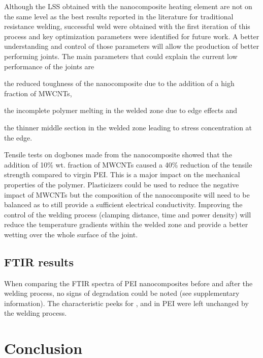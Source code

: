 \documentclass[11pt,review,times]{elsarticle}
\begin{document}
Although the LSS obtained with the nanocomposite heating element are not on the same level as the best results reported in the literature for traditional resistance welding, successful weld were obtained with the first iteration of this process and key optimization parameters were identified for future work. 
A better understanding and control of those parameters will allow the production of better performing joints. 
The main parameters that could explain the current low performance of the joints are \begin{enumerate*}[label=(\arabic*)]
	\item the reduced toughness of the nanocomposite due to the addition of a high fraction of MWCNTs,
	\item the incomplete polymer melting in the welded zone due to edge effects and
	\item the thinner middle section in the welded zone leading to stress concentration at the edge. 
\end{enumerate*}
Tensile tests on dogbones made from the nanocomposite showed that the addition of 10\% wt. fraction of MWCNTs caused a 40\% reduction of the tensile strength compared to virgin PEI. 
This is a major impact on the mechanical properties of the polymer. 
Plasticizers could be used to reduce the negative impact of MWCNTs but the composition of the nanocomposite will need to be balanced as to still provide a sufficient electrical conductivity. 
Improving the control of the welding process (clamping distance, time and power density) will reduce the temperature gradients within the welded zone and provide a better wetting over the whole surface of the joint. 

\subsection{FTIR results}

When comparing the FTIR spectra of PEI nanocomposites before and after the welding process, no signs of degradation could be noted (see supplementary information). 
The characteristic peeks for ,  and  in PEI were left unchanged by the welding process. 

							\section{Conclusion}
\end{document}
